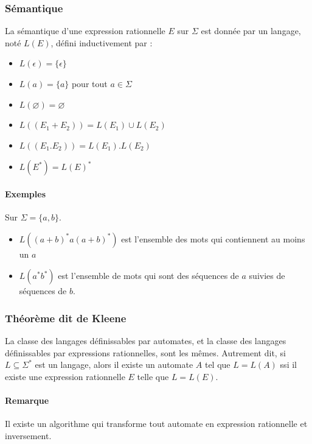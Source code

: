 \documentclass[a4paper]{article}
\begin{document}
  \subsubsection{Sémantique}
  La sémantique d'une expression rationnelle $E$ sur $\Sigma$ est donnée 
par un 
  langage, noté $L(E)$, défini inductivement par :
  \begin{itemize}
    \item $L(\epsilon) = \{\epsilon\}$
    \item $L(a) = \{a\}$ pour tout $a \in \Sigma$
    \item $L(\varnothing) = \varnothing$
    \item $L((E_1+E_2)) = L(E_1) \cup L(E_2)$
    \item $L((E_1.E_2)) = L(E_1) . L(E_2)$
    \item $L(E^*) = L(E)^*$
  \end{itemize}

  \paragraph{Exemples} Sur $\Sigma = \{a,b\}$.
  \begin{itemize}
    \item $L((a+b)^*a(a+b)^*)$ est l'ensemble des mots qui contiennent 
au moins un $a$
    \item $L(a^*b^*)$ est l'ensemble de mots qui sont des séquences de 
$a$ suivies 
    de séquences de $b$.
  \end{itemize}

  \subsubsection{Théorème dit de Kleene}
  La classe des langages définissables par automates, et la classe des 
langages
  définissables par expressions rationnelles, sont les mêmes. Autrement 
dit, si 
  $L \subseteq \Sigma^*$ est un langage, alors il existe un automate $A$ 
tel
  que $L = L(A)$ ssi il existe une expression rationnelle $E$ telle que 
$L = L(E)$.\\

  \paragraph{Remarque} Il existe un algorithme qui transforme tout 
automate
  en expression rationnelle et inversement.
\end{document}
